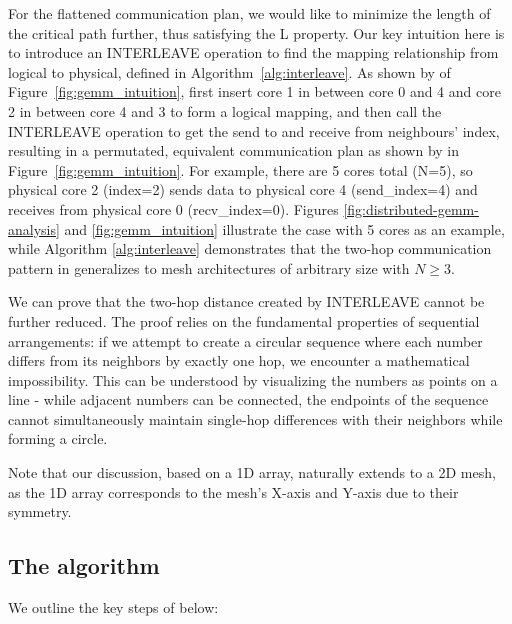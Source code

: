  For the flattened communication plan, we would like to minimize the length of the critical path further, thus satisfying the L property. Our key intuition here is to introduce an INTERLEAVE operation to find the mapping relationship from logical to physical, defined in Algorithm~\ref{alg:interleave}. As shown by  of Figure~\ref{fig:gemm_intuition}, \gemm first insert core 1 in between core 0 and 4 and core 2 in between core 4 and 3 to form a logical mapping, and then call the INTERLEAVE operation to get the send to and receive from neighbours' index, resulting in a permutated, equivalent communication plan as shown by  in Figure~\ref{fig:gemm_intuition}. For example, there are 5 cores total (N=5), so physical core 2 (index=2) sends data to physical core 4 (send\_index=4) and receives from physical core 0 (recv\_index=0). Figures \ref{fig:distributed-gemm-analysis} and \ref{fig:gemm_intuition} illustrate the case with 5 cores as an example, while Algorithm \ref{alg:interleave} demonstrates that the two-hop communication pattern in \gemm generalizes to mesh architectures of arbitrary size with $N \geq 3$.

  We can prove that the two-hop distance created by INTERLEAVE cannot be further reduced. The proof relies on the fundamental properties of sequential arrangements: if we attempt to create a circular sequence where each number differs from its neighbors by exactly one hop, we encounter a mathematical impossibility. This can be understood by visualizing the numbers as points on a line - while adjacent numbers can be connected, the endpoints of the sequence cannot simultaneously maintain single-hop differences with their neighbors while forming a circle.

Note that our discussion, based on a 1D array, naturally extends to a 2D mesh, as the 1D array corresponds to the mesh's X-axis and Y-axis due to their symmetry.

\vspace{-0.3cm}
\subsection{The \gemm algorithm} \label{subsec:meshgemm} 

We outline the key steps of \gemm below:

